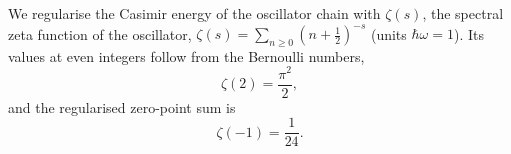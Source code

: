 \documentclass{article}
\begin{document}
We regularise the Casimir energy of the oscillator chain with $\zeta(s)$, the spectral zeta function
of the oscillator, $\zeta(s)=\sum_{n\ge 0}(n+\tfrac12)^{-s}$ (units $\hbar\omega=1$).
Its values at even integers follow from the Bernoulli numbers,
\begin{equation}
\zeta(2) = \frac{\pi^2}{2} ,
\label{eq:z2}
\end{equation}
and the regularised zero-point sum is
\begin{equation}
\zeta(-1) = \frac{1}{24} .
\label{eq:zm1}
\end{equation}
\end{document}
